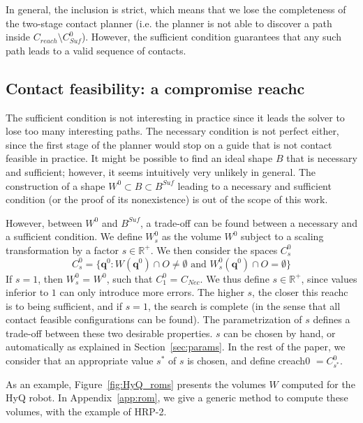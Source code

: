 In general, the inclusion is strict, which means that we lose the completeness of the two-stage contact planner (i.e. the planner is not able to discover a path inside \mbox{$C_{reach} \setminus C_{Suf}^0$}). However, the sufficient condition guarantees that any such path leads to a valid sequence of contacts.

\subsection{Contact feasibility: a compromise \gls{reachc}}
The sufficient condition is not interesting in practice since it leads the solver to lose too many interesting paths. The necessary condition is not perfect either, since the first stage of the planner would stop on a guide that is not \gls{contact feasible} in practice. It might be possible to find an ideal shape $B$ that is necessary and sufficient; however, it seems intuitively very unlikely in general. The construction of a shape $W^0 \subset B \subset B^{Suf}$ leading to a necessary and sufficient condition (or the proof of its nonexistence) is out of the scope of this work.

However, between $W^0$ and $B^{Suf}$, a trade-off can be found between a necessary and a sufficient condition. We define $W^0_s$ as the volume $W^0$ subject to a scaling transformation by a factor $s \in \mathbb{R}^+$.
%
We then consider the spaces $C_{s}^0$
 \begin{equation}
C^0_s = \{ \mathbf{q}^0 : W(\mathbf{q}^{0}) \cap O \neq \emptyset \text{ and } W^0_s(\mathbf{q}^{0}) \cap O = \emptyset \} %
\end{equation}
%
If $s=1$, then $W^0_s$ = $W^0$, such that $C_1^0$ = $C_{Nec}$. We thus define $s \in \mathbb{R}^+$, since values inferior to $1$ can only introduce more errors.
The higher $s$, the closer this \gls{reachc} is to being sufficient, and if $s=1$, the search is complete (in the sense that all \gls{contact feasible} configurations can be found). The parametrization of $s$ defines a trade-off between these two desirable properties. $s$ can be chosen by hand, or automatically as explained in Section~\ref{sec:params}.
In the rest of the paper, we consider that an appropriate value $s^*$ of $s$ is chosen, and define \gls{creach0} $= C^0_{s^*}$.

As an example, Figure~\ref{fig:HyQ_roms} presents the volumes $W$ computed for the HyQ robot.
In Appendix~\ref{app:rom}, we give a generic method to compute these volumes, with the example of HRP-2.

